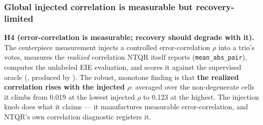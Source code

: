 \documentclass[
]{article}
\begin{document}
\subsubsection{Global injected correlation is measurable but
recovery-limited}\label{global-injected-correlation-is-measurable-but-recovery-limited}

\textbf{H4 (error-correlation is measurable; recovery should degrade
with it).} The centerpiece measurement injects a controlled
error-correlation \(\rho\) into a trio's votes, measures the
\emph{realized} correlation NTQR itself reports
(\texttt{mean\_abs\_pair}), computes the unlabeled EIE evaluation, and
scores it against the supervised oracle
(, produced by
). The robust,
monotone finding is that \textbf{the realized correlation rises with the
injected \(\rho\)}: averaged over the non-degenerate cells it climbs
from 0.019 at the lowest injected \(\rho\) to 0.123 at the highest. The
injection knob does what it claims --- it manufactures measurable
error-correlation, and NTQR's own correlation diagnostic registers it.
\end{document}
